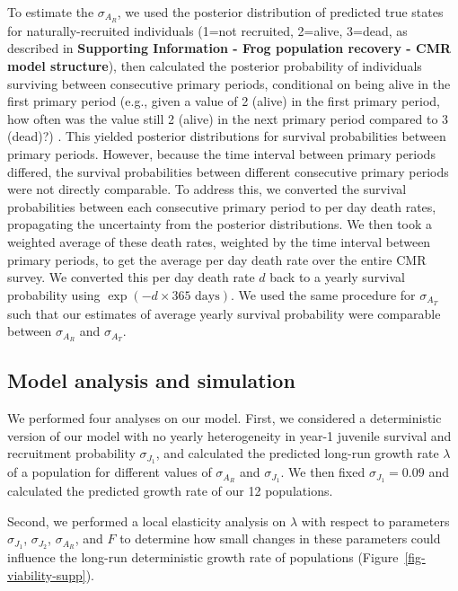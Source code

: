 \documentclass[9pt,twoside,lineno]{pnas-new}
\begin{document}
To estimate the \(\sigma_{A_R}\), we used the posterior distribution of
predicted true states for naturally-recruited individuals (1=not
recruited, 2=alive, 3=dead, as described in \textbf{Supporting
Information - Frog population recovery - CMR model structure}), then
calculated the posterior probability of individuals surviving between
consecutive primary periods, conditional on being alive in the first
primary period (e.g., given a value of 2 (alive) in the first primary
period, how often was the value still 2 (alive) in the next primary
period compared to 3 (dead)?) . This yielded posterior distributions for
survival probabilities between primary periods. However, because the
time interval between primary periods differed, the survival
probabilities between different consecutive primary periods were not
directly comparable. To address this, we converted the survival
probabilities between each consecutive primary period to per day death
rates, propagating the uncertainty from the posterior distributions. We
then took a weighted average of these death rates, weighted by the time
interval between primary periods, to get the average per day death rate
over the entire CMR survey. We converted this per day death rate \(d\)
back to a yearly survival probability using
\(\exp(-d \times 365 \text{ days})\). We used the same procedure for
\(\sigma_{A_T}\) such that our estimates of average yearly survival
probability were comparable between \(\sigma_{A_R}\) and
\(\sigma_{A_T}\).

\hypertarget{model-analysis-and-simulation}{%
\subsection{Model analysis and
simulation}\label{model-analysis-and-simulation}}

We performed four analyses on our model. First, we considered a
deterministic version of our model with no yearly heterogeneity in
year-1 juvenile survival and recruitment probability \(\sigma_{J_1}\),
and calculated the predicted long-run growth rate \(\lambda\) of a
population for different values of \(\sigma_{A_R}\) and
\(\sigma_{J_1}\). We then fixed \(\sigma_{J_1} = 0.09\) and calculated
the predicted growth rate of our 12 populations.

Second, we performed a local elasticity analysis on \(\lambda\) with
respect to parameters \(\sigma_{J_1}\), \(\sigma_{J_2}\),
\(\sigma_{A_R}\), and \(F\) to determine how small changes in these
parameters could influence the long-run deterministic growth rate of
populations (Figure~\ref{fig-viability-supp}).
\end{document}
